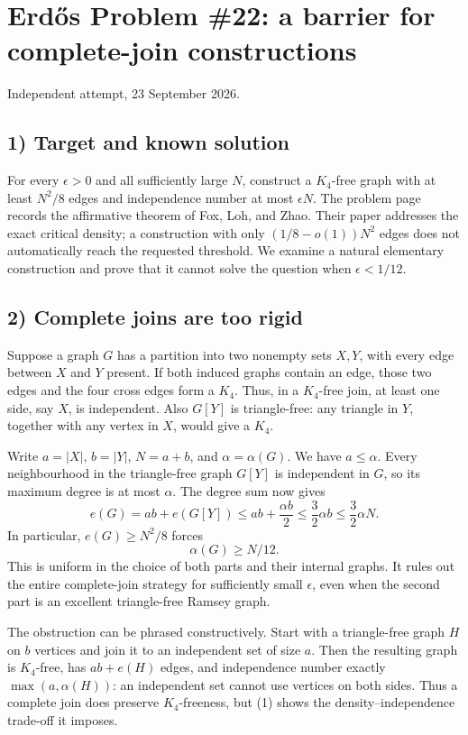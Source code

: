 \section{Erd\H{o}s Problem \#22: a barrier for complete-join constructions}
\noindent Independent attempt, 23 September 2026.

\subsection*{1) Target and known solution}
For every $\epsilon>0$ and all sufficiently large $N$, construct a $K_4$-free graph with at least $N^2/8$ edges and independence number at most $\epsilon N$. The problem page records the affirmative theorem of Fox, Loh, and Zhao. Their paper addresses the exact critical density; a construction with only $(1/8-o(1))N^2$ edges does not automatically reach the requested threshold. We examine a natural elementary construction and prove that it cannot solve the question when $\epsilon<1/12$.

\subsection*{2) Complete joins are too rigid}
Suppose a graph $G$ has a partition into two nonempty sets $X,Y$, with every edge between $X$ and $Y$ present. If both induced graphs contain an edge, those two edges and the four cross edges form a $K_4$. Thus, in a $K_4$-free join, at least one side, say $X$, is independent. Also $G[Y]$ is triangle-free: any triangle in $Y$, together with any vertex in $X$, would give a $K_4$.

Write $a=|X|$, $b=|Y|$, $N=a+b$, and $\alpha=\alpha(G)$. We have $a\le\alpha$. Every neighbourhood in the triangle-free graph $G[Y]$ is independent in $G$, so its maximum degree is at most $\alpha$. The degree sum now gives
\[
 e(G)=ab+e(G[Y])\le ab+\frac{\alpha b}{2}
 \le\frac32\alpha b\le\frac32\alpha N.\tag{1}
\]
In particular, $e(G)\ge N^2/8$ forces
\[
 \boxed{\alpha(G)\ge N/12.}
\]
This is uniform in the choice of both parts and their internal graphs. It rules out the entire complete-join strategy for sufficiently small $\epsilon$, even when the second part is an excellent triangle-free Ramsey graph.

The obstruction can be phrased constructively. Start with a triangle-free graph $H$ on $b$ vertices and join it to an independent set of size $a$. Then the resulting graph is $K_4$-free, has $ab+e(H)$ edges, and independence number exactly $\max(a,\alpha(H))$: an independent set cannot use vertices on both sides. Thus a complete join does preserve $K_4$-freeness, but (1) shows the density--independence trade-off it imposes.

